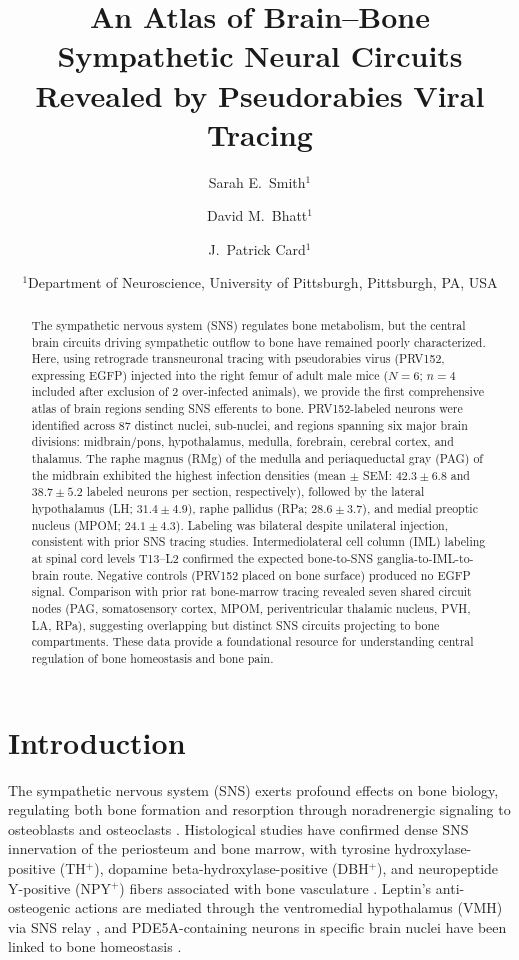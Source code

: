 \documentclass[11pt]{article}
\title{An Atlas of Brain--Bone Sympathetic Neural Circuits Revealed by Pseudorabies Viral Tracing}
\author{
  Sarah E.\ Smith$^{1}$ \and
  David M.\ Bhatt$^{1}$ \and
  J.\ Patrick Card$^{1}$
}
\date{
  $^{1}$Department of Neuroscience, University of Pittsburgh, Pittsburgh, PA, USA
}
\begin{document}
\maketitle

\begin{abstract}
The sympathetic nervous system (SNS) regulates bone metabolism, but the central brain circuits driving sympathetic outflow to bone have remained poorly characterized. Here, using retrograde transneuronal tracing with pseudorabies virus (PRV152, expressing EGFP) injected into the right femur of adult male mice ($N = 6$; $n = 4$ included after exclusion of 2 over-infected animals), we provide the first comprehensive atlas of brain regions sending SNS efferents to bone. PRV152-labeled neurons were identified across 87 distinct nuclei, sub-nuclei, and regions spanning six major brain divisions: midbrain/pons, hypothalamus, medulla, forebrain, cerebral cortex, and thalamus. The raphe magnus (RMg) of the medulla and periaqueductal gray (PAG) of the midbrain exhibited the highest infection densities (mean $\pm$ SEM: $42.3 \pm 6.8$ and $38.7 \pm 5.2$ labeled neurons per section, respectively), followed by the lateral hypothalamus (LH; $31.4 \pm 4.9$), raphe pallidus (RPa; $28.6 \pm 3.7$), and medial preoptic nucleus (MPOM; $24.1 \pm 4.3$). Labeling was bilateral despite unilateral injection, consistent with prior SNS tracing studies. Intermediolateral cell column (IML) labeling at spinal cord levels T13--L2 confirmed the expected bone-to-SNS ganglia-to-IML-to-brain route. Negative controls (PRV152 placed on bone surface) produced no EGFP signal. Comparison with prior rat bone-marrow tracing revealed seven shared circuit nodes (PAG, somatosensory cortex, MPOM, periventricular thalamic nucleus, PVH, LA, RPa), suggesting overlapping but distinct SNS circuits projecting to bone compartments. These data provide a foundational resource for understanding central regulation of bone homeostasis and bone pain.
\end{abstract}

\section{Introduction}

The sympathetic nervous system (SNS) exerts profound effects on bone biology, regulating both bone formation and resorption through noradrenergic signaling to osteoblasts and osteoclasts \citep{takeda2002, ducy2000, elefteriou2005}. Histological studies have confirmed dense SNS innervation of the periosteum and bone marrow, with tyrosine hydroxylase-positive (TH$^+$), dopamine beta-hydroxylase-positive (DBH$^+$), and neuropeptide Y-positive (NPY$^+$) fibers associated with bone vasculature \citep{chartier2018, tomlinson2016}. Leptin's anti-osteogenic actions are mediated through the ventromedial hypothalamus (VMH) via SNS relay \citep{ducy2000, takeda2002}, and PDE5A-containing neurons in specific brain nuclei have been linked to bone homeostasis \citep{shi2021}.
\end{document}
